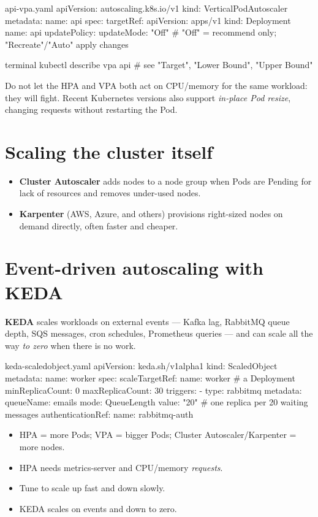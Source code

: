\begin{yamlcode}{api-vpa.yaml}
apiVersion: autoscaling.k8s.io/v1
kind: VerticalPodAutoscaler
metadata:
  name: api
spec:
  targetRef:
    apiVersion: apps/v1
    kind: Deployment
    name: api
  updatePolicy:
    updateMode: "Off"          # "Off" = recommend only; "Recreate"/"Auto" apply changes
\end{yamlcode}

\begin{bashcode}{terminal}
kubectl describe vpa api       # see "Target", "Lower Bound", "Upper Bound"
\end{bashcode}

Do not let the HPA and VPA both act on CPU/memory for the same workload: they
will fight. Recent Kubernetes versions also support \emph{in-place Pod
resize}, changing requests without restarting the Pod.

\section{Scaling the cluster itself}

\begin{itemize}
  \item \textbf{Cluster Autoscaler} adds nodes to a node group when Pods are
        Pending for lack of resources and removes under-used nodes.
  \item \textbf{Karpenter} (AWS, Azure, and others) provisions right-sized
        nodes on demand directly, often faster and cheaper.
\end{itemize}

\section{Event-driven autoscaling with KEDA}

\textbf{KEDA} scales workloads on external events --- Kafka lag, RabbitMQ queue
depth, SQS messages, cron schedules, Prometheus queries --- and can scale all
the way \emph{to zero} when there is no work.

\begin{yamlcode}{keda-scaledobject.yaml}
apiVersion: keda.sh/v1alpha1
kind: ScaledObject
metadata:
  name: worker
spec:
  scaleTargetRef:
    name: worker               # a Deployment
  minReplicaCount: 0
  maxReplicaCount: 30
  triggers:
    - type: rabbitmq
      metadata:
        queueName: emails
        mode: QueueLength
        value: "20"            # one replica per 20 waiting messages
      authenticationRef:
        name: rabbitmq-auth
\end{yamlcode}

\begin{recap}
\begin{itemize}
  \item HPA = more Pods; VPA = bigger Pods; Cluster Autoscaler/Karpenter = more nodes.
  \item HPA needs metrics-server and CPU/memory \emph{requests}.
  \item Tune  to scale up fast and down slowly.
  \item KEDA scales on events and down to zero.
\end{itemize}
\end{recap}
